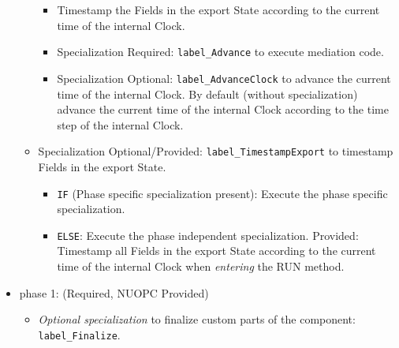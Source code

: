 \begin{itemize}
\begin{itemize}
  \begin{itemize}
  \item Timestamp the Fields in the export State according to the current time of the internal Clock.
  \item {\sc Specialization Required}: {\tt label\_Advance} to execute mediation code.
  \item {\sc Specialization Optional}: {\tt label\_AdvanceClock} to advance the current time of the internal Clock. By default (without specialization) advance the current time of the internal Clock according to the time step of the internal Clock.
  \end{itemize}
  \item {\sc Specialization Optional/Provided}: {\tt label\_TimestampExport} to timestamp Fields in the export State.
  \begin{itemize}
  \item {\tt IF} (Phase specific specialization present): Execute the phase specific specialization.
  \item {\tt ELSE}: Execute the phase independent specialization. {\sc Provided}: Timestamp all Fields in the export State according to the current time of the internal Clock when {\em entering} the RUN method.
  \end{itemize}
  \end{itemize}    
\end{itemize}

\begin{itemize}
\item phase 1: ({\sc Required, NUOPC Provided})
  \begin{itemize}
  \item {\it Optional specialization} to finalize custom parts of the component: {\tt label\_Finalize}.
  \end{itemize}      
\end{itemize}

\mbox{}\hrulefill\ 

